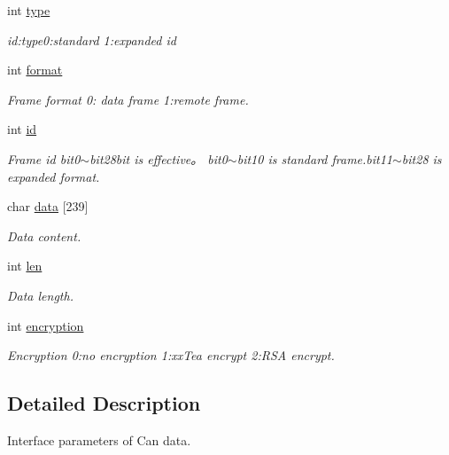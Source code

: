 \begin{DoxyCompactItemize}
\item 
int \hyperlink{struct_p_v_s_d_k___m_o_u_n_t_a_p_i___c_a_n___d_a_t_a_a5c4d6a5c9452e4991aa4f069d5a021f9}{type}
\begin{DoxyCompactList}\small\item\em id\+:type0\+:standard 1\+:expanded id \end{DoxyCompactList}\item 
int \hyperlink{struct_p_v_s_d_k___m_o_u_n_t_a_p_i___c_a_n___d_a_t_a_a0b9733687fff7041bcb8c42547964490}{format}
\begin{DoxyCompactList}\small\item\em Frame format 0\+: data frame 1\+:remote frame. \end{DoxyCompactList}\item 
int \hyperlink{struct_p_v_s_d_k___m_o_u_n_t_a_p_i___c_a_n___d_a_t_a_ab5123078c73e751bb4b33aa411cc742a}{id}
\begin{DoxyCompactList}\small\item\em Frame id bit0$\sim$bit28bit is effective。 bit0$\sim$bit10 is standard frame.\+bit11$\sim$bit28 is expanded format. \end{DoxyCompactList}\item 
char \hyperlink{struct_p_v_s_d_k___m_o_u_n_t_a_p_i___c_a_n___d_a_t_a_aaf2d373e8a885dca140afca32cbec1c5}{data} \mbox{[}239\mbox{]}
\begin{DoxyCompactList}\small\item\em Data content. \end{DoxyCompactList}\item 
int \hyperlink{struct_p_v_s_d_k___m_o_u_n_t_a_p_i___c_a_n___d_a_t_a_a7d08db338210f85a676338147171efbb}{len}
\begin{DoxyCompactList}\small\item\em Data length. \end{DoxyCompactList}\item 
int \hyperlink{struct_p_v_s_d_k___m_o_u_n_t_a_p_i___c_a_n___d_a_t_a_a7e193669093bd66e17058964dd3e6dc8}{encryption}
\begin{DoxyCompactList}\small\item\em Encryption 0\+:no encryption 1\+:xx\+Tea encrypt 2\+:R\+SA encrypt. \end{DoxyCompactList}\end{DoxyCompactItemize}


\subsection{Detailed Description}
Interface parameters of Can data. 

